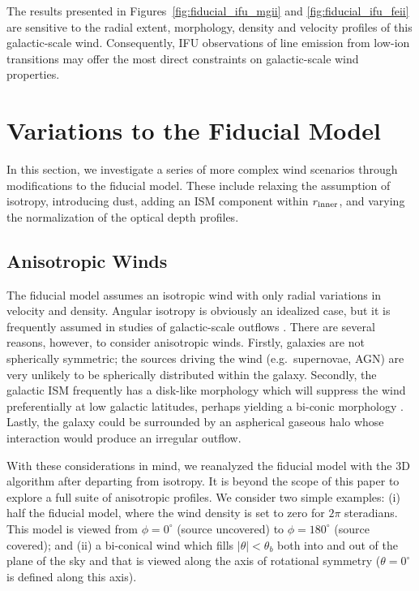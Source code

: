 \documentclass[12pt,preprint]{aastex}
\begin{document}
The results presented in Figures~\ref{fig:fiducial_ifu_mgii} and
\ref{fig:fiducial_ifu_feii} are sensitive to the radial extent,
morphology, density and velocity profiles of this galactic-scale
wind.  Consequently, IFU observations of line emission from low-ion
transitions may offer the most direct constraints on galactic-scale
wind properties. 


\section{Variations to the Fiducial Model}
\label{sec:variants}

In this section, we investigate a series of more complex wind
scenarios
through modifications to the fiducial model.  These include relaxing
the assumption of isotropy, introducing dust, adding an ISM
component within $r_{\rm inner}$, and varying the normalization of the
optical depth profiles.

\subsection{Anisotropic Winds}
\label{sec:anisotropic}

The fiducial model assumes an
isotropic wind with only radial variations in velocity and density. 
Angular isotropy is obviously an idealized case, but
it is frequently assumed in studies of galactic-scale outflows
\citep[e.g.][]{steidel+10}.   There are several reasons, however, to
consider anisotropic winds.  Firstly, galaxies are not spherically
symmetric;  the sources driving the
wind (e.g.\ supernovae, AGN) are very unlikely to be spherically distributed
within the galaxy.  
Secondly, the galactic ISM frequently has a disk-like morphology
which will suppress the wind preferentially at low galactic latitudes,
perhaps yielding a bi-conic morphology \citep[e.g.][]{ham90,wws02}.
Lastly, the galaxy could be surrounded by an
aspherical gaseous halo whose interaction would produce an irregular 
outflow.

With these considerations in mind, we reanalyzed the fiducial model
with the 3D algorithm after departing from isotropy.  It is beyond the
scope of this paper to explore a full suite of anisotropic profiles.
We consider two simple examples: (i) half the fiducial model, where 
the wind density is set to zero for $2\pi$ steradians.  This model is
viewed from $\phi = 0^\circ$ (source uncovered) 
to $\phi = 180^\circ$ (source covered); and 
(ii) a bi-conical wind which fills 
$|\theta| < \theta_b$ both into and out of the plane of the sky and that is
viewed along the axis of rotational symmetry ($\theta = 0^\circ$ is
defined along this axis).
\end{document}
